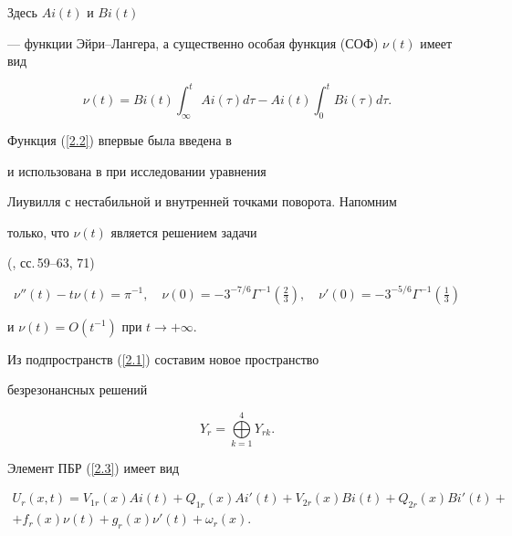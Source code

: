 Здесь $Ai ({t})$ и $Bi ({t})$


--- функции Эйри--Лангера, а существенно особая функция (СОФ) $\nu


 ({t})$ имеет вид


\begin{equation}


\label{2.2}


\nu ({t}) = Bi ({t}


)\int_{\infty }^{t} {Ai} ({\tau }


)d\tau - {Ai} ({t}) \int_{0}^{t}


{{Bi} ({\tau })d\tau.}


\end{equation}


Функция (\ref{2.2}) впервые была введена в


\cite{Bobochko4} и использована в \cite{Bobochko5} при исследовании уравнения


Лиувилля с нестабильной и внутренней точками поворота. Напомним


только, что $\nu ({t})$ является решением задачи


(\cite{Bobochko3}, сс.\,59--63, 71)


$$


\nu'' (t) - t \nu (t) = \pi^{-1} , \quad \nu (0) = - 3^{-7/6}


\Gamma^{- 1} (\tfrac{2}{3}), \quad \nu'(0) = -


3^{-5/6} \Gamma^{- 1} (\tfrac{1}{3})


$$


и $\nu (t) =O (t^{-1})$ при $t \to + \infty$.





Из подпространств (\ref{2.1}) составим новое пространство


безрезонансных решений


\begin{equation}


\label{2.3}


Y_r = \bigoplus \limits_{k = 1}^4 Y_{rk}.


\end{equation}





Элемент ПБР (\ref{2.3}) имеет вид


\begin{multline}\label{2.4}


U_{r} (x,t) = V_{1r} (x){Ai} ({t}) + Q_{1r}


({x}){Ai}'({t}) +


V_{2r} ({x}){Bi} ({t}) +


Q_{2r} ({x}){Bi}' ({t})+ \\


%


+ f_{r} ({x})\nu ({t}) +


g_{r} ({x}){\nu }' ({t}) + \omega


_{r} ({x}).


\end{multline}





